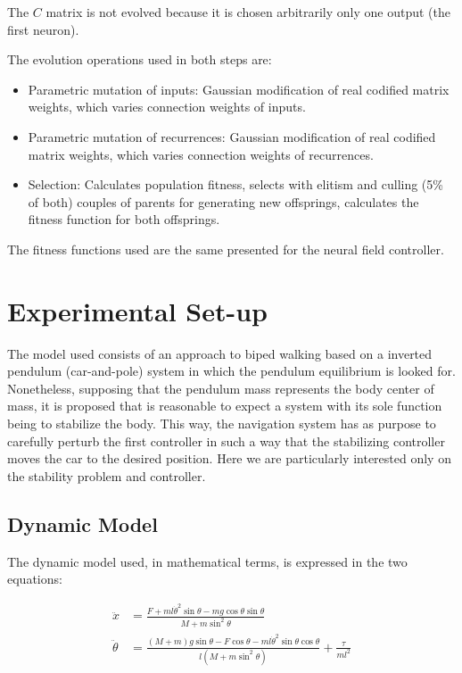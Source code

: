 The $C$ matrix is not evolved because it is chosen arbitrarily only
one output (the first neuron). 

The evolution operations used in both steps are:
\begin{itemize}
 \item Parametric mutation of inputs: Gaussian modification of real
   codified matrix weights, which varies connection weights of inputs.
 \item Parametric mutation of recurrences: Gaussian modification of real
   codified matrix weights, which varies connection weights of recurrences.
 \item Selection: Calculates population fitness, selects with elitism
   and culling (5\% of both) couples of parents for generating new
   offsprings, calculates the fitness function for both offsprings.
\end{itemize}

The fitness functions used are the same presented for the neural field controller.

\section{Experimental Set-up}
\label{sec:setup}

The model used consists of an approach to biped walking based on a
inverted pendulum (car-and-pole) system in which the pendulum equilibrium is looked
for. Nonetheless, supposing that the pendulum mass represents the body
center of mass, it is proposed that is reasonable to expect a system
with its sole function being to stabilize the body. This way, the
navigation system has as purpose to carefully perturb the first controller
in such a way that the stabilizing controller moves the car to the
desired position. Here we are particularly interested only on the
stability problem and controller.

\subsection*{Dynamic Model}
The dynamic model used, in mathematical terms, is expressed in the two
equations:

\begin{align}
\ddot{x}&=\frac{F+ml\dot{\theta}^2\sin\theta-mg\cos\theta\sin\theta}{M+m\sin^2\theta}\\
\ddot{\theta}&=\frac{(M+m)g\sin\theta-F\cos\theta-ml\dot{\theta}^2\sin\theta\cos\theta}{l(M+m\sin^2\theta)}+\frac{\tau}{ml^2}
\end{align} 

